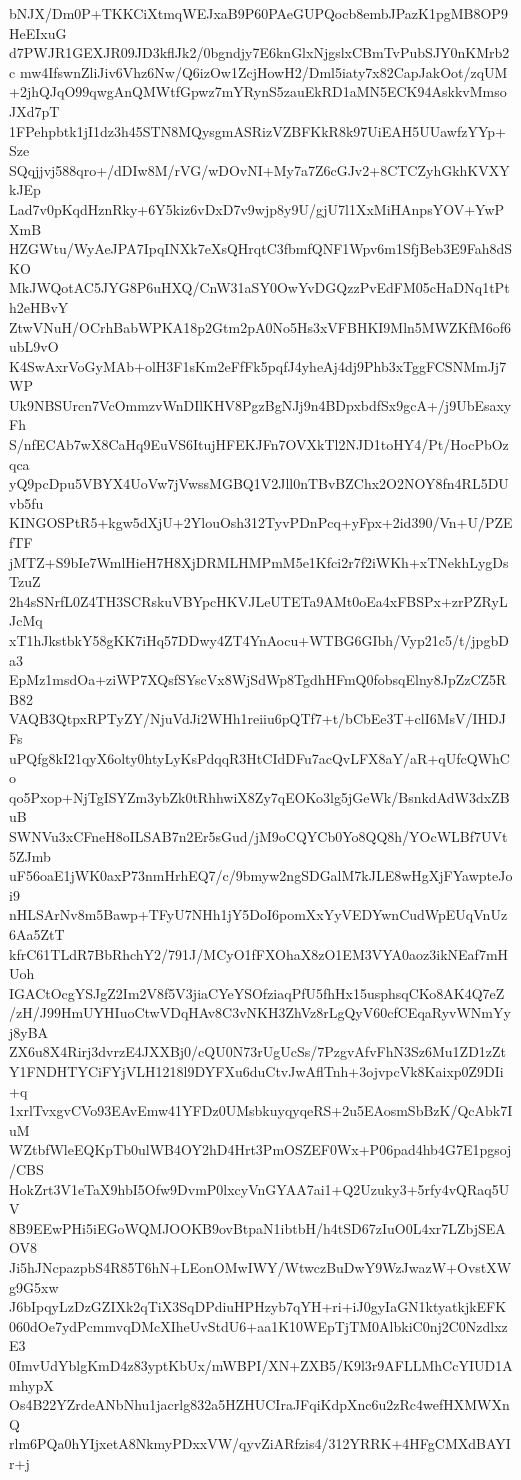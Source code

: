 bNJX/Dm0P+TKKCiXtmqWEJxaB9P60PAeGUPQocb8embJPazK1pgMB8OP9HeEIxuG
d7PWJR1GEXJR09JD3kflJk2/0bgndjy7E6knGlxNjgslxCBmTvPubSJY0nKMrb2c
mw4IfswnZliJiv6Vhz6Nw/Q6izOw1ZcjHowH2/Dml5iaty7x82CapJakOot/zqUM
+2jhQJqO99qwgAnQMWtfGpwz7mYRynS5zauEkRD1aMN5ECK94AskkvMmsoJXd7pT
1FPehpbtk1jI1dz3h45STN8MQysgmASRizVZBFKkR8k97UiEAH5UUawfzYYp+Sze
SQqjjvj588qro+/dDIw8M/rVG/wDOvNI+My7a7Z6cGJv2+8CTCZyhGkhKVXYkJEp
Lad7v0pKqdHznRky+6Y5kiz6vDxD7v9wjp8y9U/gjU7l1XxMiHAnpsYOV+YwPXmB
HZGWtu/WyAeJPA7IpqINXk7eXsQHrqtC3fbmfQNF1Wpv6m1SfjBeb3E9Fah8dSKO
MkJWQotAC5JYG8P6uHXQ/CnW31aSY0OwYvDGQzzPvEdFM05cHaDNq1tPth2eHBvY
ZtwVNuH/OCrhBabWPKA18p2Gtm2pA0No5Hs3xVFBHKI9Mln5MWZKfM6of6ubL9vO
K4SwAxrVoGyMAb+olH3F1sKm2eFfFk5pqfJ4yheAj4dj9Phb3xTggFCSNMmJj7WP
Uk9NBSUrcn7VcOmmzvWnDIlKHV8PgzBgNJj9n4BDpxbdfSx9gcA+/j9UbEsaxyFh
S/nfECAb7wX8CaHq9EuVS6ItujHFEKJFn7OVXkTl2NJD1toHY4/Pt/HocPbOzqca
yQ9pcDpu5VBYX4UoVw7jVwssMGBQ1V2Jll0nTBvBZChx2O2NOY8fn4RL5DUvb5fu
KINGOSPtR5+kgw5dXjU+2YlouOsh312TyvPDnPcq+yFpx+2id390/Vn+U/PZEfTF
jMTZ+S9bIe7WmlHieH7H8XjDRMLHMPmM5e1Kfci2r7f2iWKh+xTNekhLygDsTzuZ
2h4sSNrfL0Z4TH3SCRskuVBYpcHKVJLeUTETa9AMt0oEa4xFBSPx+zrPZRyLJcMq
xT1hJkstbkY58gKK7iHq57DDwy4ZT4YnAocu+WTBG6GIbh/Vyp21c5/t/jpgbDa3
EpMz1msdOa+ziWP7XQsfSYscVx8WjSdWp8TgdhHFmQ0fobsqElny8JpZzCZ5RB82
VAQB3QtpxRPTyZY/NjuVdJi2WHh1reiiu6pQTf7+t/bCbEe3T+clI6MsV/IHDJFs
uPQfg8kI21qyX6olty0htyLyKsPdqqR3HtCIdDFu7acQvLFX8aY/aR+qUfcQWhCo
qo5Pxop+NjTgISYZm3ybZk0tRhhwiX8Zy7qEOKo3lg5jGeWk/BsnkdAdW3dxZBuB
SWNVu3xCFneH8oILSAB7n2Er5sGud/jM9oCQYCb0Yo8QQ8h/YOcWLBf7UVt5ZJmb
uF56oaE1jWK0axP73nmHrhEQ7/c/9bmyw2ngSDGalM7kJLE8wHgXjFYawpteJoi9
nHLSArNv8m5Bawp+TFyU7NHh1jY5DoI6pomXxYyVEDYwnCudWpEUqVnUz6Aa5ZtT
kfrC61TLdR7BbRhchY2/791J/MCyO1fFXOhaX8zO1EM3VYA0aoz3ikNEaf7mHUoh
IGACtOcgYSJgZ2Im2V8f5V3jiaCYeYSOfziaqPfU5fhHx15usphsqCKo8AK4Q7eZ
/zH/J99HmUYHIuoCtwVDqHAv8C3vNKH3ZhVz8rLgQyV60cfCEqaRyvWNmYyj8yBA
ZX6u8X4Rirj3dvrzE4JXXBj0/cQU0N73rUgUcSs/7PzgvAfvFhN3Sz6Mu1ZD1zZt
Y1FNDHTYCiFYjVLH1218l9DYFXu6duCtvJwAflTnh+3ojvpcVk8Kaixp0Z9DIi+q
1xrlTvxgvCVo93EAvEmw41YFDz0UMsbkuyqyqeRS+2u5EAosmSbBzK/QcAbk7IuM
WZtbfWleEQKpTb0ulWB4OY2hD4Hrt3PmOSZEF0Wx+P06pad4hb4G7E1pgsoj/CBS
HokZrt3V1eTaX9hbI5Ofw9DvmP0lxcyVnGYAA7ai1+Q2Uzuky3+5rfy4vQRaq5UV
8B9EEwPHi5iEGoWQMJOOKB9ovBtpaN1ibtbH/h4tSD67zIuO0L4xr7LZbjSEAOV8
Ji5hJNcpazpbS4R85T6hN+LEonOMwIWY/WtwczBuDwY9WzJwazW+OvstXWg9G5xw
J6bIpqyLzDzGZIXk2qTiX3SqDPdiuHPHzyb7qYH+ri+iJ0gyIaGN1ktyatkjkEFK
060dOe7ydPcmmvqDMcXIheUvStdU6+aa1K10WEpTjTM0AlbkiC0nj2C0NzdlxzE3
0ImvUdYblgKmD4z83yptKbUx/mWBPI/XN+ZXB5/K9l3r9AFLLMhCcYIUD1AmhypX
Os4B22YZrdeANbNhu1jacrlg832a5HZHUCIraJFqiKdpXnc6u2zRc4wefHXMWXnQ
rlm6PQa0hYIjxetA8NkmyPDxxVW/qyvZiARfzis4/312YRRK+4HFgCMXdBAYIr+j
